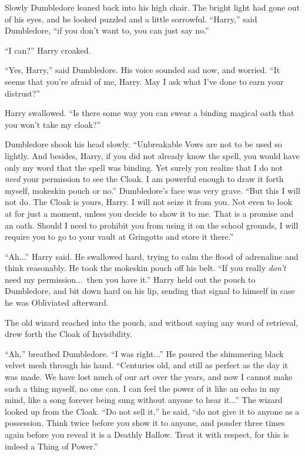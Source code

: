 Slowly Dumbledore leaned back into his high chair. The bright light had gone out of his eyes, and he looked puzzled and a little sorrowful. “Harry,” said Dumbledore, “if you don’t want to, you can just say no.”

“I can?” Harry croaked.

“Yes, Harry,” said Dumbledore. His voice sounded sad now, and worried. “It seems that you’re afraid of me, Harry. May I ask what I’ve done to earn your distrust?”

Harry swallowed. “Is there some way you can swear a binding magical oath that you won’t take my cloak?”

Dumbledore shook his head slowly. “Unbreakable Vows are not to be used so lightly. And besides, Harry, if you did not already know the spell, you would have only my word that the spell was binding. Yet surely you realize that I do not \emph{need} your permission to see the Cloak. I am powerful enough to draw it forth myself, mokeskin pouch or no.” Dumbledore’s face was very grave. “But this I will not do. The Cloak is yours, Harry. I will not seize it from you. Not even to look at for just a moment, unless you decide to show it to me. That is a promise and an oath. Should I need to prohibit you from using it on the school grounds, I will require you to go to your vault at Gringotts and store it there.”

“Ah...” Harry said. He swallowed hard, trying to calm the flood of adrenaline and think reasonably. He took the mokeskin pouch off his belt. “If you really \emph{don’t} need my permission...\ then you have it.” Harry held out the pouch to Dumbledore, and bit down hard on his lip, sending that signal to himself in case he was Obliviated afterward.

The old wizard reached into the pouch, and without saying any word of retrieval, drew forth the Cloak of Invisibility.

“Ah,” breathed Dumbledore. “I was right...” He poured the shimmering black velvet mesh through his hand. “Centuries old, and still as perfect as the day it was made. We have lost much of our art over the years, and now I cannot make such a thing myself, no one can. I can feel the power of it like an echo in my mind, like a song forever being sung without anyone to hear it...” The wizard looked up from the Cloak. “Do not sell it,” he said, “do not give it to anyone as a possession. Think twice before you show it to anyone, and ponder three times again before you reveal it is a Deathly Hallow. Treat it with respect, for this is indeed a Thing of Power.”

